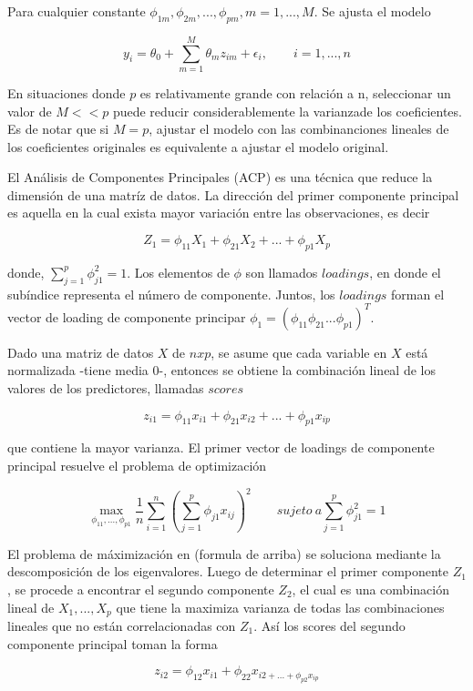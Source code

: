 \documentclass[a4paper,12pt]{Latex/Classes/PhDthesisPSnPDF}
\begin{document}
Para cualquier constante $ \phi_{1m}, \phi_{2m}, ..., \phi_{pm}, m = 1, ..., M $. Se ajusta el modelo

$$ y_{i} = \theta_{0} + \sum_{m = 1}^{M} \theta_{m}z_{im} + \epsilon_{i},  \qquad i = 1, ..., n $$

En situaciones donde $p$ es relativamente grande con relación a n, seleccionar un valor de $M << p$ puede reducir considerablemente la varianzade los coeficientes. Es de notar que si $M = p$, ajustar el modelo con las combinanciones lineales de los coeficientes originales es equivalente a ajustar el modelo original.

El Análisis de Componentes Principales (ACP) es una técnica que reduce la dimensión de una matríz de datos. La dirección del primer componente principal es aquella en la cual exista mayor variación entre las observaciones, es decir

$$ Z_{1} = \phi_{11}X_{1} + \phi_{21}X_{2} + ... + \phi_{p1}X_{p} $$

donde, $ \sum_{j=1}^{p} \phi_{j1}^{2} = 1 $. Los elementos de $ \phi $ son llamados $loadings$, en donde el subíndice representa el número de componente. Juntos, los $loadings$ forman el vector de loading de componente principar $\phi_{1} = (\phi_{11} \phi_{21}... \phi_{p1})^T$.

Dado una matriz de datos $X$ de $n x p$, se asume que cada variable en $X$ está normalizada -tiene media 0-, entonces se obtiene la combinación lineal de los valores de los predictores, llamadas $scores$

$$ z_{i1} = \phi_{11} x_{i1} + \phi_{21} x_{i2} + ... + \phi_{p1} x_{ip} $$

que contiene la mayor varianza. El primer vector de loadings de componente principal resuelve el problema de optimización

$$ \max_{\phi_{11}, ..., \phi_{p1}}
\frac{1}{n} \sum_{i = 1}^{n} (\sum_{j=1}^{p} \phi_{j1} x_{ij})^2
\qquad sujeto \ a  \sum_{j=1}^{p} \phi_{j1}^{2} = 1
$$

El problema de máximización en (formula de arriba) se soluciona mediante la descomposición de los eigenvalores. Luego de determinar el primer componente $Z_{1}$, se procede a encontrar el segundo componente $Z_{2}$, el cual es una combinación lineal de $ X_{1}, ..., X_{p} $ que tiene la maximiza varianza de todas las combinaciones lineales que no están correlacionadas con $Z_{1}$. Así los scores del segundo componente principal toman la forma

$$ z_{i2} = \phi_{12}x_{i1} + \phi_{22}x_{i2 + ... + \phi_{p2}x_{ip}} $$
\end{document}

